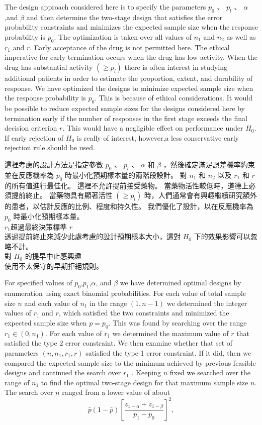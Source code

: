 	The design approach considered here is to specify the parameters $p_0$ 、 $p_l$ 、 $\alpha$,and $\beta$ and then determine the two-stage design that satisfies the error probability constraints and minimizes the expected sample size when the response probability is $p_0$. The optimization is taken over all values of $n_1$ and $n_2$ as well as $r_1$ and $r$. Early acceptance of the drug is not permitted here. The ethical imperative for early termination occurs when the drug has low activity. When the drug has substantial activity $(\geq p_l)$ there is often interest in studying additional patients in order to estimate the proportion, extent, and durability of response. We have optimized the designs to minimize expected sample size when the response probability is $p_0$. This is because of ethical considerations. It would be possible to reduce expected sample sizes for the designs considered here by termination early if the number of responses in the first stage exceeds the final decision criterion $r$. This would have a negligible effect on performance under $H_0$. If early rejection of $H_0$ is really of interest, however,a less conservative early rejection rule should be used.

	這裡考慮的設計方法是指定參數 $p_0$ 、 $p_l$ 、 $\alpha$ 和 $\beta$ ，然後確定滿足誤差機率約束並在反應機率為 $p_0$ 時最小化預期樣本量的兩階段設計。 對 $n_1$ 和 $n_2$ 以及 $r_1$ 和 $r$ 的所有值進行最佳化。 這裡不允許提前接受藥物。 當藥物活性較低時，道德上必須提前終止。 當藥物具有顯著活性 $(\geq p_l)$ 時，人們通常會有興趣繼續研究額外的患者，以估計反應的比例、程度和持久性。 我們優化了設計，以在反應機率為 $p_0$ 時最小化預期樣本量。\\
$r_1$超過最終決策標準 $r$\\
透過提前終止來減少此處考慮的設計預期樣本大小，這對 $H_0$ 下的效果影響可以忽略不計。 \\
對 $H_0$ 的提早中止感興趣\\
使用不太保守的早期拒絕規則。

	For specified values of $p_0$,$p_1$,$\alpha$, and $\beta$ we have determined optimal designs by enumeration using exact binomial probabilities. For each value of total sample size $n$ and each value of $n_1$ in the range $(1,n-1)$ we determined the integer values of $r_1$ and $r$, which satisfied the two constraints and minimized the expected sample size when $p = p_0$. This was found by searching over the range $r_1 \in (0,n_1)$. For each value of $r_1$ we determined the maximum value of $r$ that satisfied the type 2 error constraint. We then examine whether that set of parameters $(n,n_1,r_1,r)$ satisfied the type 1 error constraint. If it did, then we compared the expected sample size to the minimum achieved by previous feasible designs and continued the search over $r_1$ . Keeping $n$ fixed we searched over the range of $n_1$ to find the optimal two-stage design for that maximum sample size $n$. The search over $n$ ranged from a lower value of about
$$\bar{p}(1-\bar{p}) \left[ \frac{z_{1-\alpha}+z_{1-\beta}}{p_1-p_0}\right]^2,$$

